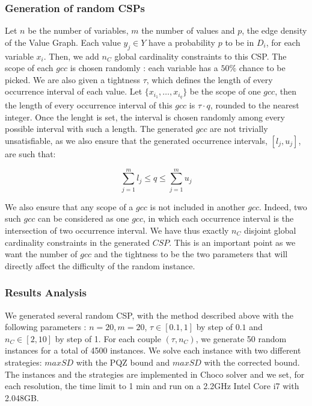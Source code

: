 \documentclass[jair,twoside,11pt,theapa]{article}
\begin{document}
\subsubsection{Generation of random CSPs}

Let $n$ be the number of variables, $m$ the number of values and $p$, the edge density of the Value Graph. Each value $y_j \in Y$ have a probability $p$ to be in $D_i$, for each variable $x_i$. Then, we add $n_C$ global cardinality constraints to this CSP. 
The scope of each $gcc$ is chosen randomly : each variable has a $50\%$ chance to be picked. We are also given a tightness $\tau$, which defines the length of every occurrence interval of each value. Let $\lbrace x_{i_1}, \ldots, x_{i_q}\rbrace$ be the scope of one $gcc$, then the length of every occurrence interval of this $gcc$ is $\tau \cdot q$, rounded to the nearest integer. Once the lenght is set, the interval is chosen randomly among every possible interval with such a length. The generated $gcc$ are not trivially unsatisfiable, as we also ensure that the generated occurrence intervals, $[l_j, u_j]$, are such that:

\begin{equation*}
	\sum_{j=1}^m l_j \leq q \leq \sum_{j=1}^m u_j
\end{equation*}

We also ensure that any scope of a $gcc$ is not included in another $gcc$. Indeed, two such $gcc$ can be considered as one $gcc$, in which each occurrence interval is the intersection of two occurrence interval. We have thus exactly $n_C$ disjoint global cardinality constraints in the generated $CSP$. This is an important point as we want the number of $gcc$ and the tightness to be the two parameters that will directly affect the difficulty of the random instance.



\subsubsection{Results Analysis}

We generated several random CSP, with the method described above with the following parameters : $n=20, m=20$, $\tau \in [0.1,1]$ by step of $0.1$ and $n_C \in [2,10]$ by step of 1. For each couple $(\tau, n_C)$, we generate 50 random instances for a total of 4500 instances. We solve each instance with two different strategies: $maxSD$ with the PQZ bound and $maxSD$ with the corrected bound. The instances and the strategies are implemented in Choco solver \cite{chocoSolver} and we set, for each resolution, the time limit to 1 min and run on a 2.2GHz Intel Core i7 with 2.048GB.
\end{document}
